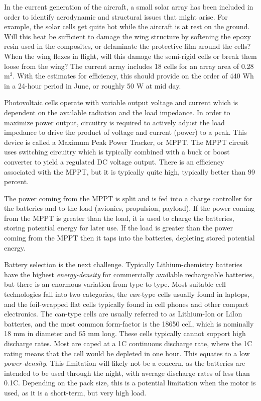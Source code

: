 \documentclass{ifacconf}
\begin{document}
In the current generation of the aircraft, a small solar array has been included in order to identify aerodynamic and structural issues that might arise. For example, the solar cells get quite hot while the aircraft is at rest on the ground. Will this heat be sufficient to damage the wing structure by softening the epoxy resin used in the composites, or delaminate the protective film around the cells? When the wing flexes in flight, will this damage the semi-rigid cells or break them loose from the wing? The current array includes 18 cells for an array area of 0.28 m$^2$. With the estimates for efficiency, this should provide on the order of 440 Wh in a 24-hour period in June, or roughly 50 W at mid day.

Photovoltaic cells operate with variable output voltage and current which is dependent on the available radiation and the load impedance. In order to maximize power output, circuitry is required to actively adjust the load impedance to drive the product of voltage and current (power) to a peak. This device is called a Maximum Peak Power Tracker, or MPPT. The MPPT circuit uses switching circuitry which is typically combined with a buck or boost converter to yield a regulated DC voltage output. There is an efficiency associated with the MPPT, but it is typically quite high, typically better than 99 percent.

The power coming from the MPPT is split and is fed into a charge controller for the batteries and to the load (avionics, propulsion, payload). If the power coming from the MPPT is greater than the load, it is used to charge the batteries, storing potential energy for later use. If the load is greater than the power coming from the MPPT then it taps into the batteries, depleting stored potential energy.

Battery selection is the next challenge. Typically Lithium-chemistry batteries have the highest \emph{energy-density} for commercially available rechargeable batteries, but there is an enormous variation from type to type. Most suitable cell technologies fall into two categories, the \emph{can}-type cells usually found in laptops, and the foil-wrapped flat cells typically found in cell phones and other compact electronics. The can-type cells are usually referred to as Lithium-Ion or LiIon batteries, and the most common form-factor is the 18650 cell, which is nominally 18 mm in diameter and 65 mm long. These cells typically cannot support high discharge rates. Most are caped at a 1C continuous discharge rate, where the 1C rating means that the cell would be depleted in one hour. This equates to a low \emph{power-density}. This limitation will likely not be a concern, as the batteries are intended to be used through the night, with average discharge rates of less than 0.1C. Depending on the pack size, this is a potential limitation when the motor is used, as it is a short-term, but very high load.
\end{document}
